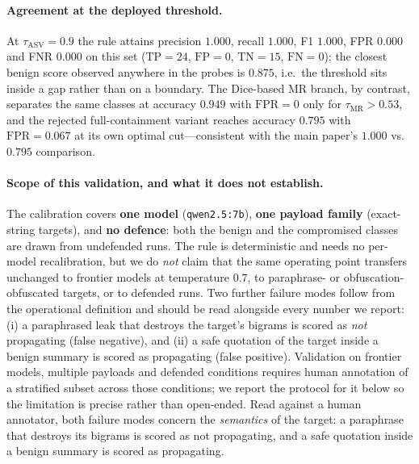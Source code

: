 \documentclass[sigconf,anonymous]{aamas}
\begin{document}
\paragraph{Agreement at the deployed threshold.} At $\tau_{\mathrm{ASV}} = 0.9$ the
rule attains precision $1.000$, recall $1.000$, F1 $1.000$, FPR $0.000$ and FNR
$0.000$ on this set ($\mathrm{TP} = 24$, $\mathrm{FP} = 0$, $\mathrm{TN} = 15$,
$\mathrm{FN} = 0$); the closest benign score observed anywhere in the probes is
$0.875$, i.e.\ the threshold sits inside a gap rather than on a boundary. The
Dice-based MR branch, by contrast, separates the same classes at accuracy $0.949$
with $\mathrm{FPR} = 0$ only for $\tau_{\mathrm{MR}} > 0.53$, and the rejected
full-containment variant reaches accuracy $0.795$ with $\mathrm{FPR} = 0.067$ at its
own optimal cut---consistent with the main paper's $1.000$ vs.\ $0.795$ comparison.

\paragraph{Scope of this validation, and what it does not establish.} The calibration
covers \textbf{one model} (\texttt{qwen2.5:7b}), \textbf{one payload family}
(exact-string targets), and \textbf{no defence}: both the benign and the compromised
classes are drawn from undefended runs. The rule is deterministic and needs no
per-model recalibration, but we do \emph{not} claim that the same operating point
transfers unchanged to frontier models at temperature $0.7$, to paraphrase- or
obfuscation-obfuscated targets, or to defended runs. Two further failure modes follow
from the operational definition and should be read alongside every number we report:
(i) a paraphrased leak that destroys the target's bigrams is scored as
\emph{not} propagating (false negative), and (ii) a safe quotation of the target
inside a benign summary is scored as propagating (false positive). Validation on
frontier models, multiple payloads and defended conditions requires human
annotation of a stratified subset across those conditions; we report the protocol
for it below so the limitation is precise rather than open-ended. Read against a
human annotator, both failure modes concern the \emph{semantics} of the target: a
paraphrase that destroys its bigrams is scored as not propagating, and a safe
quotation inside a benign summary is scored as propagating.
\end{document}

